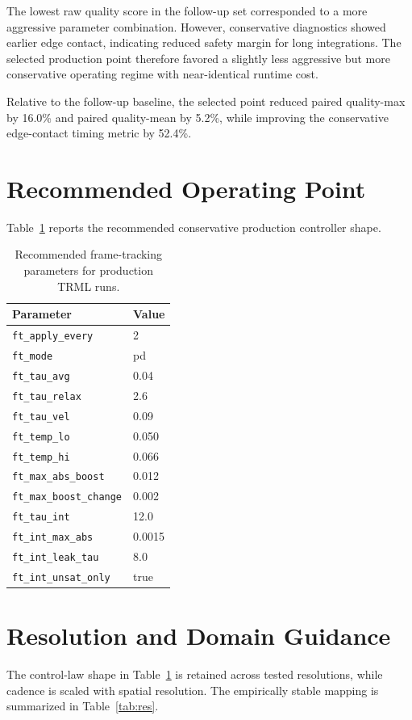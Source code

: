 \documentclass[10pt,twocolumn]{article}
\begin{document}
The lowest raw quality score in the follow-up set corresponded to a more aggressive parameter combination. However, conservative diagnostics showed earlier edge contact, indicating reduced safety margin for long integrations. The selected production point therefore favored a slightly less aggressive but more conservative operating regime with near-identical runtime cost.

Relative to the follow-up baseline, the selected point reduced paired quality-max by 16.0\% and paired quality-mean by 5.2\%, while improving the conservative edge-contact timing metric by 52.4\%.

\section{Recommended Operating Point}
Table~\ref{tab:best} reports the recommended conservative production controller shape.

\begin{table}[t]
\centering
\small
\caption{Recommended frame-tracking parameters for production TRML runs.}
\label{tab:best}
\begin{tabular}{@{}ll@{}}
\toprule
Parameter & Value \\
\midrule
\texttt{ft\_apply\_every} & 2 \\
\texttt{ft\_mode} & pd \\
\texttt{ft\_tau\_avg} & 0.04 \\
\texttt{ft\_tau\_relax} & 2.6 \\
\texttt{ft\_tau\_vel} & 0.09 \\
\texttt{ft\_temp\_lo} & 0.050 \\
\texttt{ft\_temp\_hi} & 0.066 \\
\texttt{ft\_max\_abs\_boost} & 0.012 \\
\texttt{ft\_max\_boost\_change} & 0.002 \\
\texttt{ft\_tau\_int} & 12.0 \\
\texttt{ft\_int\_max\_abs} & 0.0015 \\
\texttt{ft\_int\_leak\_tau} & 8.0 \\
\texttt{ft\_int\_unsat\_only} & true \\
\bottomrule
\end{tabular}
\end{table}

\section{Resolution and Domain Guidance}
The control-law shape in Table~\ref{tab:best} is retained across tested resolutions, while cadence is scaled with spatial resolution. The empirically stable mapping is summarized in Table~\ref{tab:res}.
\end{document}
